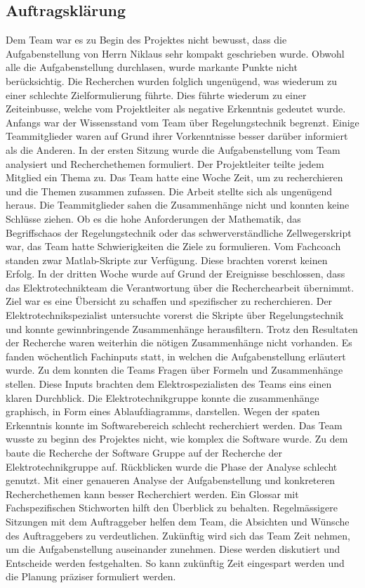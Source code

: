 \subsection{Auftragsklärung}
Dem Team war es zu Begin des Projektes nicht bewusst, dass die Aufgabenstellung von Herrn Niklaus sehr kompakt geschrieben wurde. Obwohl alle die Aufgabenstellung durchlasen, wurde markante Punkte nicht berücksichtig. Die Recherchen wurden folglich ungenügend, was wiederum zu einer schlechte Zielformulierung führte. Dies führte wiederum zu einer Zeiteinbusse, welche vom Projektleiter als negative Erkenntnis gedeutet wurde. 
Anfangs war der Wissensstand vom Team über Regelungstechnik begrenzt. Einige Teammitglieder waren auf Grund ihrer Vorkenntnisse besser darüber informiert als die Anderen. In der ersten Sitzung wurde die Aufgabenstellung vom Team analysiert und Recherchethemen formuliert. Der Projektleiter teilte jedem Mitglied ein Thema zu. Das Team hatte eine Woche Zeit, um zu recherchieren und die Themen zusammen zufassen. Die Arbeit stellte sich als ungenügend heraus. Die Teammitglieder sahen die Zusammenhänge nicht und konnten keine Schlüsse ziehen. Ob es die hohe Anforderungen der Mathematik, das Begriffschaos der Regelungstechnik oder das schwerverständliche Zellwegerskript war, das Team hatte Schwierigkeiten die Ziele zu formulieren. Vom Fachcoach standen zwar Matlab-Skripte zur Verfügung. Diese brachten vorerst keinen Erfolg. In der dritten Woche wurde auf Grund der Ereignisse beschlossen, dass das Elektrotechnikteam die Verantwortung über die Recherchearbeit übernimmt. Ziel war es eine Übersicht zu schaffen und spezifischer zu recherchieren. Der Elektrotechnikspezialist untersuchte vorerst die Skripte über Regelungstechnik und konnte gewinnbringende Zusammenhänge herausfiltern. Trotz den Resultaten der Recherche waren weiterhin die nötigen Zusammenhänge nicht vorhanden. Es fanden wöchentlich Fachinputs statt, in welchen die Aufgabenstellung erläutert wurde. Zu dem konnten die Teams Fragen über Formeln und Zusammenhänge stellen. Diese Inputs brachten dem Elektrospezialisten des Teams eins einen klaren Durchblick. Die Elektrotechnikgruppe konnte die zusammenhänge graphisch, in Form eines Ablaufdiagramms, darstellen. Wegen der spaten Erkenntnis konnte im Softwarebereich schlecht recherchiert werden. Das Team wusste zu beginn des Projektes nicht, wie komplex die Software wurde. Zu dem baute die Recherche der Software Gruppe auf der Recherche der Elektrotechnikgruppe auf. 
Rückblicken wurde die Phase der Analyse schlecht genutzt. Mit einer genaueren Analyse der Aufgabenstellung und konkreteren Recherchethemen kann besser Recherchiert werden. Ein Glossar mit Fachspezifischen Stichworten hilft den Überblick zu behalten. Regelmässigere Sitzungen mit dem Auftraggeber helfen dem Team, die Absichten und Wünsche des Auftraggebers zu verdeutlichen.
Zukünftig wird sich das Team Zeit nehmen, um die Aufgabenstellung auseinander zunehmen. Diese werden diskutiert und Entscheide werden festgehalten. So kann zukünftig Zeit eingespart werden und die Planung präziser formuliert werden.
